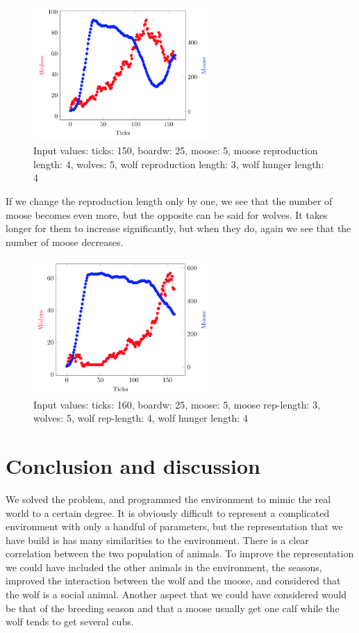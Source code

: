 \documentclass[a4paper]{report}
\begin{document}
\begin{figure}[H]
\centering
\includegraphics[width=0.60\textwidth]{Experiments/sim_rep_c1}
\caption{Input values: ticks: 150, boardw: 25, moose: 5, moose reproduction length: 4, wolves: 5, wolf reproduction length: 3, wolf hunger length: 4}
\end{figure}

If we change the reproduction length only by one, we see that the number of moose becomes even more, but the opposite can be said for wolves. It takes longer for them to increase significantly, but when they do, again we see that the number of moose decreases. 


\begin{figure}[H]
\centering
\includegraphics[width=0.60\textwidth]{Experiments/sim_rep_c2}
\caption{Input values: ticks: 160, boardw: 25, moose: 5, moose rep-length: 3, wolves: 5, wolf rep-length: 4, wolf hunger length: 4}
\end{figure}

\section{Conclusion and discussion}
We solved the problem, and programmed the environment to mimic the real world to a certain degree. It is obviously difficult to represent a complicated environment with only a handful of parameters, but the representation that we have build is has many similarities to the environment. There is a clear correlation between the two population of animals.
To improve the representation we could have included the other animals in the environment, the seasons, improved the interaction between the wolf and the moose, and considered that the wolf is a social animal. Another aspect that we could have considered would be that of the breeding season and that a moose usually get one calf while the wolf tends to get several cubs.
\end{document}
